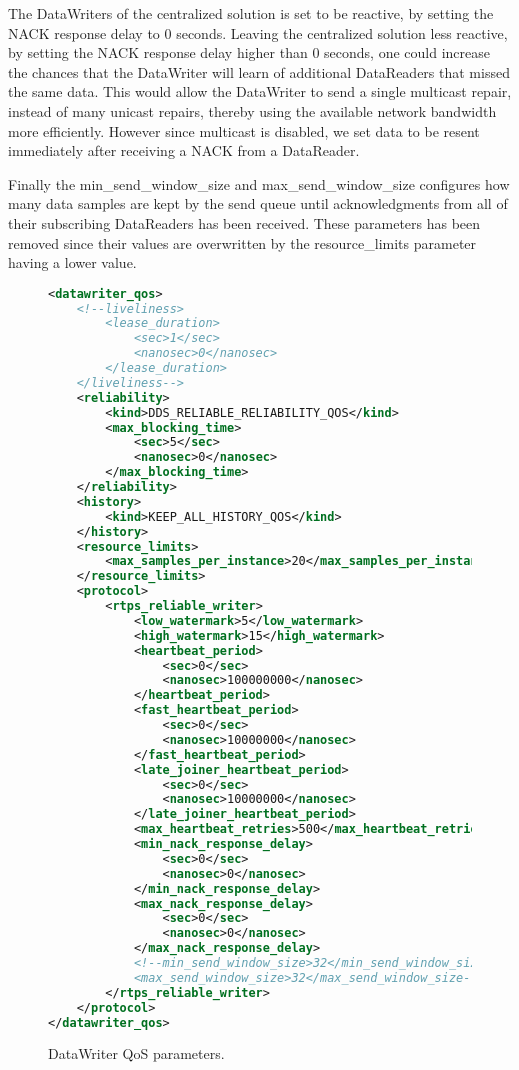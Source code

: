 \begin{itemize}
	The DataWriters of the centralized solution is set to be reactive, by setting the NACK response delay to 0 seconds. Leaving the centralized solution less reactive, by setting the NACK response delay higher than 0 seconds, one could increase the chances that the DataWriter will learn of additional DataReaders that missed the same data. This would allow the DataWriter to send a single multicast repair, instead of many unicast repairs, thereby using the available network bandwidth more efficiently. However since multicast is disabled, we set data to be resent immediately after receiving a NACK from a DataReader. 
	
	Finally the min\_send\_window\_size and max\_send\_window\_size configures how many data samples are kept by the send queue until acknowledgments from all of their subscribing DataReaders has been received. These parameters has been removed since their values are overwritten by the resource\_limits parameter having a lower value.
\end{itemize}

\begin{figure}[!h]
\begin{lstlisting}[language=XML]
<datawriter_qos>
	<!--liveliness>
		<lease_duration>
			<sec>1</sec>
			<nanosec>0</nanosec>
		</lease_duration>
	</liveliness-->
	<reliability>
		<kind>DDS_RELIABLE_RELIABILITY_QOS</kind>
		<max_blocking_time>
			<sec>5</sec>
			<nanosec>0</nanosec>
		</max_blocking_time>
	</reliability>
	<history>
		<kind>KEEP_ALL_HISTORY_QOS</kind>
	</history>
	<resource_limits>
		<max_samples_per_instance>20</max_samples_per_instance>
	</resource_limits>
	<protocol>
		<rtps_reliable_writer>
			<low_watermark>5</low_watermark>
			<high_watermark>15</high_watermark>
			<heartbeat_period>
				<sec>0</sec>
				<nanosec>100000000</nanosec>
			</heartbeat_period>
			<fast_heartbeat_period>
				<sec>0</sec>
				<nanosec>10000000</nanosec>
			</fast_heartbeat_period>
			<late_joiner_heartbeat_period>
				<sec>0</sec>
				<nanosec>10000000</nanosec>
			</late_joiner_heartbeat_period>
			<max_heartbeat_retries>500</max_heartbeat_retries>
			<min_nack_response_delay>
				<sec>0</sec>
				<nanosec>0</nanosec>
			</min_nack_response_delay>
			<max_nack_response_delay>
				<sec>0</sec>
				<nanosec>0</nanosec>
			</max_nack_response_delay>
			<!--min_send_window_size>32</min_send_window_size>
			<max_send_window_size>32</max_send_window_size-->
		</rtps_reliable_writer>
	</protocol>
</datawriter_qos>
\end{lstlisting}
\caption[DataWriter QoS parameters]{
		\label{fig:writerQoS} 
		\footnotesize{DataWriter QoS parameters.}
	}
\end{figure}

